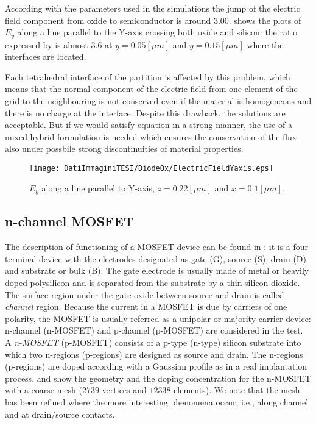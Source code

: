 According with the parameters used in the simulations the jump of the electric field component from oxide to semiconductor is around $3.00$.  shows the plots of $E_y$ along a line parallel to the Y-axis crossing both oxide and silicon: the ratio expressed by  is almost $3.6$ at $y=0.05[\mu m]$ and $y = 0.15[\mu m]$ where the interfaces are located.

Each tetrahedral interface of the partition is affected by this problem, which means that the normal component of the electric field from one element of the grid to the neighbouring is not conserved even if the material is homogeneous and there is no charge at the interface. Despite this drawback, the solutions are acceptable. But if we would satisfy equation  in a strong manner, the use of a mixed-hybrid formulation is needed which ensures the conservation of the flux also under possbile strong discontinuities of material properties.


\begin{figure}[!h]
\centering
\texttt{[image: DatiImmaginiTESI/DiodeOx/ElectricFieldYaxis.eps]}
\caption{$E_y$ along a line parallel to Y-axis, $z=0.22[\mu m]$ and $x=0.1[\mu m]$.}
\label{fig: salto electric field}
\end{figure}


\clearpage





\subsection{n-channel MOSFET}
\label{sec: MOS}

The description of functioning of a MOSFET device can be found in \cite{ModernVLSIdevices}: it is a four-terminal device with the electrodes designated as gate (G), source (S), drain (D) and substrate or bulk (B). The gate electrode is usually made of metal or heavily doped polysilicon and is separated from the substrate by a thin silicon dioxide. The surface region under the gate oxide between source and drain is called \textit{channel} region.
Because the current in a MOSFET is due by carriers of one polarity, the MOSFET is usually referred as a unipolar or majority-carrier device: n-channel (n-MOSFET) and p-channel (p-MOSFET) are considered in the test. A \textit{n-MOSFET} (p-MOSFET) consists of a p-type (n-type) silicon substrate into which two n-regions (p-regions) are designed as source and drain. The n-regions (p-regions) are doped according with a Gaussian profile as in a real implantation process. 
 and  show the geometry and the doping concentration for the n-MOSFET with a coarse mesh ($2739$ vertices and $12338$ elements). 
We note that the mesh has been refined where the more interesting phenomena occur, i.e., along channel and at drain/source contacts.

